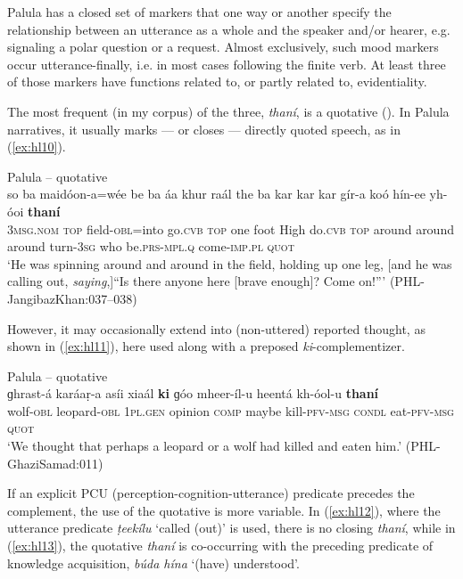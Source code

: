 \documentclass[output=paper]{langsci/langscibook}
\begin{document}
Palula has a closed set of markers that one way or another specify the relationship between an utterance as a whole and the speaker and/or hearer, e.g. signaling a polar question or a request. Almost exclusively, such mood markers occur utterance-finally, i.e. in most cases following the finite verb. At least three of those markers have functions related to, or partly related to, evidentiality.

The most frequent (in my corpus) of the three, \textit{thaní}, is a quotative (\citealt[267, 377–387]{Liljegren2016}). In Palula narratives, it usually marks — or closes — directly quoted speech, as in ‎(\ref{ex:hl10}).

\begin{exe}
	\ex Palula -- quotative \label{ex:hl10}\\
	\gll so ba maidóon-a=wée be ba áa khur raál the ba kar kar kar gír-a koó hín-ee yh-óoi \textbf{thaní}\\
	3\textsc{msg}.\textsc{nom} \textsc{top} field-\textsc{obl}=into go.\textsc{cvb} \textsc{top} one foot High do.\textsc{cvb} \textsc{top} around around around turn-3\textsc{sg} who be.\textsc{prs}-\textsc{mpl}.\textsc{q} come-\textsc{imp}.\textsc{pl} \textsc{quot}\\
	\trans ‘He was spinning around and around in the field, holding up one leg, [and he was calling out, \textit{saying},]``Is there anyone here [brave enough]? Come on!''’ (PHL-JangibazKhan:037–038)
\end{exe}

However, it may occasionally extend into (non-uttered) reported thought, as shown in ‎(\ref{ex:hl11}), here used along with a preposed \textit{ki}-complementizer.

\begin{exe}
	\ex Palula -- quotative \label{ex:hl11}\\
	\gll ɡhrast-á karáaṛ-a asíi xiaál \textbf{ki} ɡóo mheer-íl-u heentá kh-óol-u \textbf{thaní}\\
	wolf-\textsc{obl} leopard-\textsc{obl} 1\textsc{pl}.\textsc{gen} opinion \textsc{comp} maybe kill-\textsc{pfv}-\textsc{msg} \textsc{condl} eat-\textsc{pfv}-\textsc{msg} \textsc{quot}\\
	\trans ‘We thought that perhaps a leopard or a wolf had killed and eaten him.’ (PHL-GhaziSamad:011)
\end{exe}

If an explicit PCU (perception-cognition-utterance) predicate precedes the complement, the use of the quotative is more variable. In ‎(\ref{ex:hl12}), where the utterance predicate \textit{ṭeekílu} ‘called (out)’ is used, there is no closing \textit{thaní}, while in ‎(\ref{ex:hl13}), the quotative \textit{thaní} is co-occurring with the preceding predicate of knowledge acquisition, \textit{búda hína} ‘(have) understood’.
\end{document}
